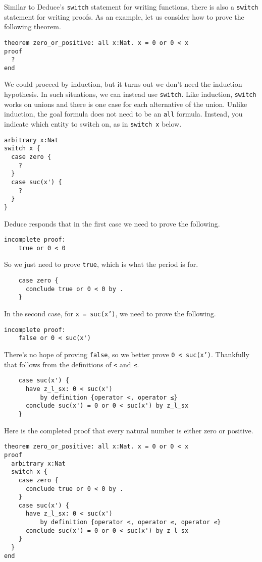\documentclass[12pt]{article}
\begin{document}
Similar to Deduce's \texttt{switch} statement for writing functions,
there is also a \texttt{switch} statement for writing proofs. As an
example, let us consider how to prove the following theorem.
\begin{verbatim}
theorem zero_or_positive: all x:Nat. x = 0 or 0 < x
proof
  ?
end
\end{verbatim}
We could proceed by induction, but it turns out we don't need the
induction hypothesis. In such situations, we can instead use \texttt{switch}.
Like induction, \texttt{switch} works on unions and there is one case for
each alternative of the union. Unlike induction, the goal formula does
not need to be an \texttt{all} formula. Instead, you indicate which entity to
switch on, as in \texttt{switch x} below.
\begin{verbatim}
arbitrary x:Nat
switch x {
  case zero {
    ?
  }
  case suc(x') {
    ?
  }
}
\end{verbatim}
Deduce responds that in the first case we need to prove the following.
\begin{verbatim}
incomplete proof:
    true or 0 < 0
\end{verbatim}
So we just need to prove \texttt{true}, which is what the period is for.
\begin{verbatim}
    case zero {
      conclude true or 0 < 0 by .
    }
\end{verbatim}
In the second case, for \texttt{x = suc(x')}, we need to prove the following.
\begin{verbatim}
incomplete proof:
    false or 0 < suc(x')
\end{verbatim}
There's no hope of proving \texttt{false}, so we better prove
\texttt{0 < suc(x')}.  Thankfully that follows from the definitions of
\texttt{<} and \texttt{≤}.
\begin{verbatim}
    case suc(x') {
      have z_l_sx: 0 < suc(x')
          by definition {operator <, operator ≤}
      conclude suc(x') = 0 or 0 < suc(x') by z_l_sx
    }
\end{verbatim}
Here is the completed proof that every natural number is either zero
or positive.

\begin{verbatim}
theorem zero_or_positive: all x:Nat. x = 0 or 0 < x
proof
  arbitrary x:Nat
  switch x {
    case zero {
      conclude true or 0 < 0 by .
    }
    case suc(x') {
      have z_l_sx: 0 < suc(x') 
          by definition {operator <, operator ≤, operator ≤}
      conclude suc(x') = 0 or 0 < suc(x') by z_l_sx
    }
  }
end
\end{verbatim}
\end{document}
